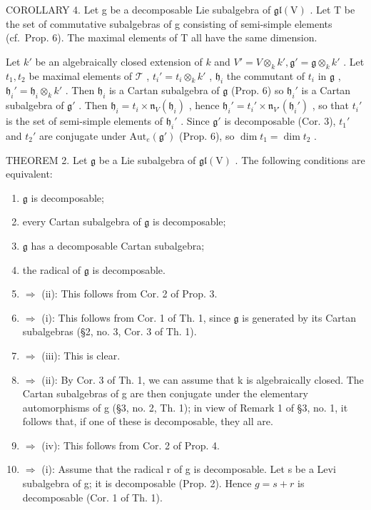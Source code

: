 COROLLARY 4. Let g be a decomposable Lie subalgebra of \(\mathfrak{gl}(\mathrm{V})\) . Let T be the set of commutative subalgebras of g consisting of semi-simple elements (cf.~Prop. 6). The maximal elements of T all have the same dimension.

Let \(k'\) be an algebraically closed extension of \(k\) and \(V' = V \otimes_k k', \mathfrak{g}' = \mathfrak{g} \otimes_k k'\) . Let \(t_1, t_2\) be maximal elements of \(\mathcal{T}\) , \(t_i' = t_i \otimes_k k'\) , \(\mathfrak{h}_i\) the commutant of \(t_i\) in \(\mathfrak{g}\) , \(\mathfrak{h}_i' = \mathfrak{h}_i \otimes_k k'\) . Then \(\mathfrak{h}_i\) is a Cartan subalgebra of \(\mathfrak{g}\) (Prop. 6) so \(\mathfrak{h}_i'\) is a Cartan subalgebra of \(\mathfrak{g}'\) . Then \(\mathfrak{h}_i = t_i \times \mathfrak{n}_V(\mathfrak{h}_i)\) , hence \(\mathfrak{h}_i' = t_i' \times \mathfrak{n}_{V'}(\mathfrak{h}_i')\) , so that \(t_i'\) is the set of semi-simple elements of \(\mathfrak{h}_i'\) . Since \(\mathfrak{g}'\) is decomposable (Cor. 3), \(t_1'\) and \(t_2'\) are conjugate under \(\text{Aut}_e(\mathfrak{g}')\) (Prop. 6), so \(\dim t_1 = \dim t_2\) .

THEOREM 2. Let \(\mathfrak{g}\) be a Lie subalgebra of \(\mathfrak{gl}(\mathrm{V})\) . The following conditions are equivalent:

\begin{enumerate}
\def\labelenumi{(\roman{enumi})}
\item
  \(\mathfrak{g}\) is decomposable;
\item
  every Cartan subalgebra of \(\mathfrak{g}\) is decomposable;
\item
  \(\mathfrak{g}\) has a decomposable Cartan subalgebra;
\item
  the radical of \(\mathfrak{g}\) is decomposable.
\item
  \(\Longrightarrow\) (ii): This follows from Cor. 2 of Prop. 3.
\item
  \(\Longrightarrow\) (i): This follows from Cor. 1 of Th. 1, since \(\mathfrak{g}\) is generated by its Cartan subalgebras (§2, no. 3, Cor. 3 of Th. 1).
\item
  \(\Longrightarrow\) (iii): This is clear.
\item
  \(\Longrightarrow\) (ii): By Cor. 3 of Th. 1, we can assume that k is algebraically closed. The Cartan subalgebras of g are then conjugate under the elementary automorphisms of g (§3, no. 2, Th. 1); in view of Remark 1 of §3, no. 1, it follows that, if one of these is decomposable, they all are.
\item
  \(\Longrightarrow\) (iv): This follows from Cor. 2 of Prop. 4.
\item
  \(\Longrightarrow\) (i): Assume that the radical r of g is decomposable. Let s be a Levi subalgebra of g; it is decomposable (Prop. 2). Hence \(g = s + r\) is decomposable (Cor. 1 of Th. 1).
\end{enumerate}

